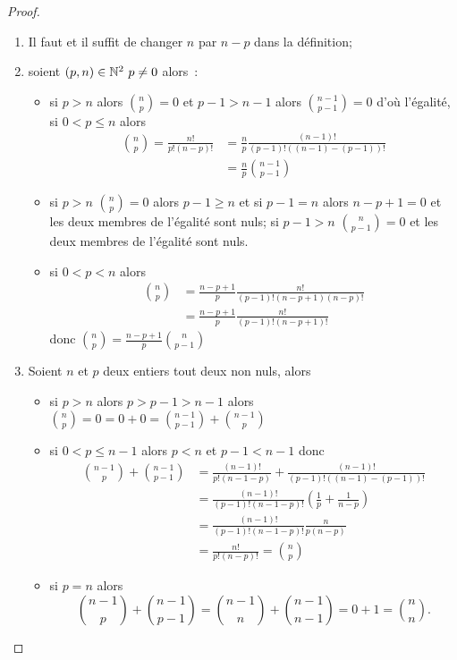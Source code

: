 \begin{proof}
  \begin{enumerate}
  \item Il faut et il suffit de changer \(n\) par \(n-p\) dans la définition;
  \item soient \((p,n)\in\mathbb{N}^2\ p\neq 0\) alors~:
    \begin{itemize} 
    \item si \(p>n\) alors \(\binom{n}{p}=0\) et \(p-1>n-1\) alors \(\binom{n-1}{p-1}=0\) d'où l'égalité, si \(0<p\leqslant n\) alors
      \begin{align}
        \binom{n}{p}=\frac{n!}{p!(n-p)!}&=\frac{n}{p}\frac{(n-1)!}{(p-1)!((n-1)-(p-1))!}\\
        &=\frac{n}{p}\binom{n-1}{p-1}
      \end{align}
    \item si \(p>n\) \(\binom{n}{p}=0\) alors \(p-1\geqslant n\) et si \(p-1=n\) alors \(n-p+1=0\) et les deux membres de l'égalité sont nuls; si \(p-1>n\)  \(\binom{n}{p-1}=0\) et les deux membres de l'égalité sont nuls.
    \item si \(0<p<n\) alors
      \begin{align}
        \binom{n}{p}&=\frac{n-p+1}{p}\frac{n!}{(p-1)!(n-p+1)(n-p)!}\\
        &=\frac{n-p+1}{p}\frac{n!}{(p-1)!(n-p+1)!}
      \end{align}
      donc \(\binom{n}{p}=\frac{n-p+1}{p}\binom{n}{p-1}\)
    \end{itemize}
  \item Soient \(n\) et \(p\) deux entiers tout deux non nuls, alors
    \begin{itemize}
    \item si \(p>n\) alors \(p>p-1>n-1\) alors \(\binom{n}{p}=0=0+0=\binom{n-1}{p-1}+\binom{n-1}{p}\)
    \item si \(0<p\leqslant n-1\) alors \(p<n\) et \(p-1<n-1\) donc
      \begin{align}
        \binom{n-1}{p}+\binom{n-1}{p-1}&=\frac{(n-1)!}{p!(n-1-p)}+\frac{(n-1)!}{(p-1)!((n-1)-(p-1))!}\\
        &=\frac{(n-1)!}{(p-1)!(n-1-p)!}\left(\frac{1}{p}+\frac{1}{n-p}\right)\\
        &=\frac{(n-1)!}{(p-1)!(n-1-p)!}\frac{n}{p(n-p)}\\
        &=\frac{n!}{p!(n-p)!}=\binom{n}{p}
      \end{align}
    \item si \(p=n\) alors
      \begin{equation}
        \binom{n-1}{p}+\binom{n-1}{p-1}=\binom{n-1}{n}+\binom{n-1}{n-1}=0+1=\binom{n}{n}.
      \end{equation}
    \end{itemize}
  \end{enumerate}
\end{proof}
